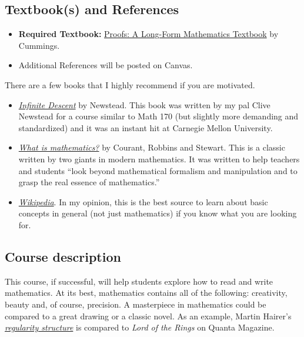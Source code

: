 \documentclass[
]{article}
\begin{document}
\subsection*{Textbook(s) and References}\label{textbooks-and-references}

\begin{itemize}
\item
  \textbf{Required Textbook:} \href{https://longformmath.com/proofs-home}{Proofs: A Long-Form Mathematics Textbook} by Cummings.
\item
  Additional References will be posted on Canvas.
\end{itemize}

There are a few books that I highly recommend if you are motivated.

\begin{itemize}
\item
  \href{https://infinitedescent.xyz/}{\emph{Infinite Descent}} by Newstead. This book was written
  by my pal Clive Newstead for a course similar to Math 170 (but slightly more demanding and standardized) and it was an instant hit at Carnegie Mellon University.
\item
  \href{https://www.amazon.com/Mathematics-Elementary-Approach-Ideas-Methods/dp/0195105192}{\emph{What is mathematics?}} by Courant, Robbins and Stewart. This is a classic written
  by two giants in modern mathematics.
  It was written to help teachers and students ``look beyond mathematical formalism and manipulation and to grasp
  the real essence of mathematics.''
\item
  \href{https://en.wikipedia.org}{\emph{Wikipedia}}. In my opinion, this is the best source
  to learn about basic concepts in general (not just mathematics) if you know what
  you are looking for.
\end{itemize}

\subsection*{Course description}\label{course-description}

This course, if successful, will help students explore how to read and write mathematics.
At its best, mathematics contains all of the following: creativity, beauty and, of course, precision.
A masterpiece in mathematics could be compared to a great drawing or a classic novel.
As an example, Martin Hairer's \href{https://www.quantamagazine.org/hearing-music-in-noise-martin-hairer-wins-the-fields-medal-20140812}{\emph{regularity structure}} is compared to \emph{Lord of the Rings}
on Quanta Magazine.
\end{document}
